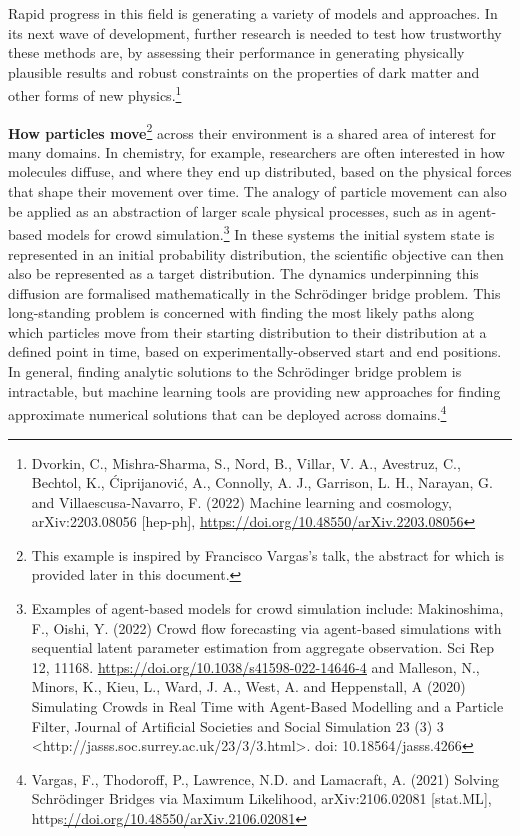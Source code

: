 {Rapid progress in this field is generating a variety of models and
approaches. In its next wave of development, further research is needed
to test how trustworthy these methods are, by assessing their
performance in generating physically plausible results and robust
constraints on the properties of dark matter and other forms of new
physics.\footnote{Dvorkin, C., Mishra-Sharma, S., Nord, B., Villar, V.
  A., Avestruz, C., Bechtol, K., Ćiprijanović, A., Connolly, A. J.,
  Garrison, L. H., Narayan, G. and Villaescusa-Navarro, F. (2022)
  Machine learning and cosmology, arXiv:2203.08056 {[}hep-ph{]},
  \url{https://doi.org/10.48550/arXiv.2203.08056}}

\textbf{How particles move}\footnote{This example is inspired by
  Francisco Vargas's talk, the abstract for which is provided later in
  this document.} across their environment is a shared area of interest
for many domains. In chemistry, for example, researchers are often
interested in how molecules diffuse, and where they end up distributed,
based on the physical forces that shape their movement over time. The
analogy of particle movement can also be applied as an abstraction of
larger scale physical processes, such as in agent-based models for crowd
simulation.\footnote{Examples of agent-based models for crowd simulation
  include: Makinoshima, F., Oishi, Y. (2022) Crowd flow forecasting via
  agent-based simulations with sequential latent parameter estimation
  from aggregate observation. Sci Rep 12, 11168.
  \href{https://doi.org/10.1038/s41598-022-14646-4}{\uline{https://doi.org/10.1038/s41598-022-14646-4}}
  and Malleson, N., Minors, K., Kieu, L., Ward, J. A., West, A. and
  Heppenstall, A (2020) Simulating Crowds in Real Time with Agent-Based
  Modelling and a Particle Filter, Journal of Artificial Societies and
  Social Simulation 23 (3) 3
  \textless http://jasss.soc.surrey.ac.uk/23/3/3.html\textgreater. doi:
  10.18564/jasss.4266} In these systems the initial system state is
represented in an initial probability distribution, the scientific
objective can then also be represented as a target distribution. The
dynamics underpinning this diffusion are formalised mathematically in
the Schrödinger bridge problem. This long-standing problem is concerned
with finding the most likely paths along which particles move from their
starting distribution to their distribution at a defined point in time,
based on experimentally-observed start and end positions. In general,
finding analytic solutions to the Schrödinger bridge problem is
intractable, but machine learning tools are providing new approaches for
finding approximate numerical solutions that can be deployed across
domains.\footnote{Vargas, F., Thodoroff, P., Lawrence, N.D. and
  Lamacraft, A. (2021) Solving Schrödinger Bridges via Maximum
  Likelihood, arXiv:2106.02081 {[}stat.ML{]},
  https\uline{://doi.org/10.48550/arXiv.2106.02081}}

}
